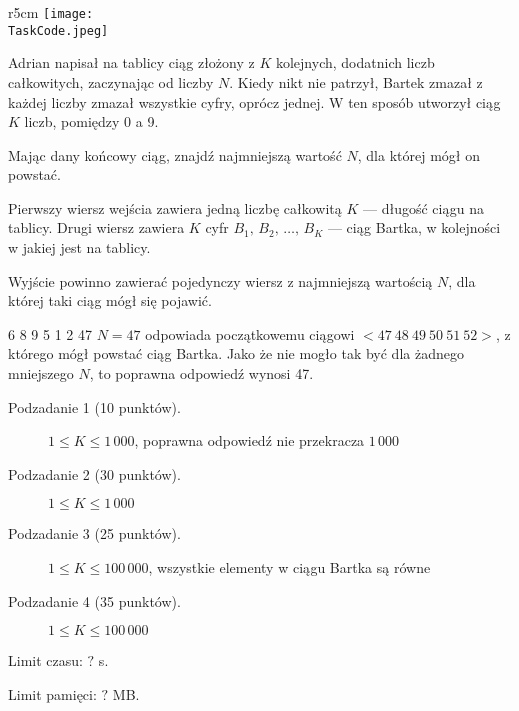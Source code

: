 \documentclass{boi2014-pl}
\renewcommand{\TaskCode}{sequence}
\begin{document}
    \begin{wrapfigure}[5]{r}{5cm}
        \vspace{-24pt}
		\texttt{[image: \\TaskCode.jpeg]}
	\end{wrapfigure}

    Adrian napisał na tablicy ciąg złożony z $K$ kolejnych, dodatnich liczb całkowitych, zaczynając od liczby $N$.
    Kiedy nikt nie patrzył, Bartek zmazał z każdej liczby zmazał wszystkie cyfry, oprócz jednej.
    W ten sposób utworzył ciąg $K$ liczb, pomiędzy 0 a 9.

    \Task

    Mając dany końcowy ciąg, znajdź najmniejszą wartość $N$, dla której mógł on powstać.

    \Input

    Pierwszy wiersz wejścia zawiera jedną liczbę całkowitą $K$ --- długość ciągu na tablicy.
    Drugi wiersz zawiera $K$ cyfr $B_1,\, B_2 ,\, \ldots ,\, B_K$ --- ciąg Bartka, w kolejności w jakiej jest na tablicy.
    
    \Output

    Wyjście powinno zawierać pojedynczy wiersz z najmniejszą wartością $N$, dla której taki ciąg mógł się pojawić.
    
    \Example

    \example
    {
        6 8 9 5 1 2
    }
    {
        47
    }
    {
        $N = 47$ odpowiada początkowemu ciągowi $<47\ 48\ 49\ 50\ 51\ 52>$, z którego mógł powstać ciąg Bartka. Jako że nie mogło tak być dla żadnego mniejszego $N$, to poprawna odpowiedź wynosi 47.
    }

\Scoring

\begin{description}
    \item[Podzadanie 1 (10 punktów).] $1 \le K \le 1\,000$, poprawna odpowiedź nie przekracza $1\,000$
    \item[Podzadanie 2 (30 punktów).] $1 \le K \le 1\,000$
    \item[Podzadanie 3 (25 punktów).] $1 \le K \le 100\,000$, wszystkie elementy w ciągu Bartka są równe
    \item[Podzadanie 4 (35 punktów).] $1 \le K \le 100\,000$
\end{description}

\Constraints

Limit czasu: $?$ s.

Limit pamięci: $?$ MB.
\end{document}
